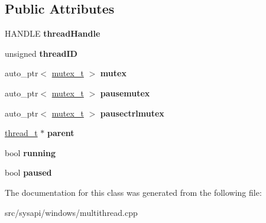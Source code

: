 \subsection*{\-Public \-Attributes}
\begin{DoxyCompactItemize}
\item 
\hypertarget{classwindowsThreadData__t_aa4e21c614a87754a53d0700baf78b43c}{\-H\-A\-N\-D\-L\-E {\bfseries thread\-Handle}}\label{classwindowsThreadData__t_aa4e21c614a87754a53d0700baf78b43c}

\item 
\hypertarget{classwindowsThreadData__t_a2b7b0e5058690cb814d7c079b43e72f1}{unsigned {\bfseries thread\-I\-D}}\label{classwindowsThreadData__t_a2b7b0e5058690cb814d7c079b43e72f1}

\item 
\hypertarget{classwindowsThreadData__t_a478e9563f032d0eb752515536819f605}{auto\-\_\-ptr$<$ \hyperlink{classmutex__t}{mutex\-\_\-t} $>$ {\bfseries mutex}}\label{classwindowsThreadData__t_a478e9563f032d0eb752515536819f605}

\item 
\hypertarget{classwindowsThreadData__t_ac3fb2dcabdc2db1e667e5829acff8271}{auto\-\_\-ptr$<$ \hyperlink{classmutex__t}{mutex\-\_\-t} $>$ {\bfseries pausemutex}}\label{classwindowsThreadData__t_ac3fb2dcabdc2db1e667e5829acff8271}

\item 
\hypertarget{classwindowsThreadData__t_a029fbb0d9626a3daf1f07382c2dffd55}{auto\-\_\-ptr$<$ \hyperlink{classmutex__t}{mutex\-\_\-t} $>$ {\bfseries pausectrlmutex}}\label{classwindowsThreadData__t_a029fbb0d9626a3daf1f07382c2dffd55}

\item 
\hypertarget{classwindowsThreadData__t_a3c5109916e3dff532c744c2fe989024d}{\hyperlink{classthread__t}{thread\-\_\-t} $\ast$ {\bfseries parent}}\label{classwindowsThreadData__t_a3c5109916e3dff532c744c2fe989024d}

\item 
\hypertarget{classwindowsThreadData__t_a0b7e88a7f9d91ed5c8b5489e5095d994}{bool {\bfseries running}}\label{classwindowsThreadData__t_a0b7e88a7f9d91ed5c8b5489e5095d994}

\item 
\hypertarget{classwindowsThreadData__t_a9ea32baa069984a304d13d23cf13dfc4}{bool {\bfseries paused}}\label{classwindowsThreadData__t_a9ea32baa069984a304d13d23cf13dfc4}

\end{DoxyCompactItemize}


\-The documentation for this class was generated from the following file\-:\begin{DoxyCompactItemize}
\item 
src/sysapi/windows/multithread.\-cpp\end{DoxyCompactItemize}
